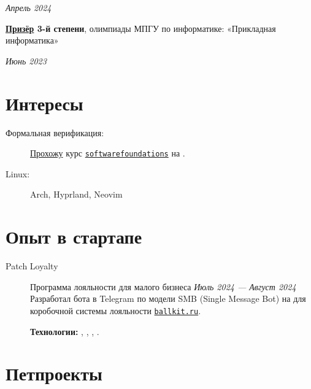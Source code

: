 \documentclass[margin,line]{resume}
\begin{document}
\begin{resume}
\hfill \textsl{Апрель 2024}

\textbf{\href{https://github.com/alchemmist/CV/blob/main/attachments/informatics-olimpic.pdf}{Призёр}
3-й степени}, олимпиады МПГУ по информатике:
«Прикладная информатика»
\vspace{-3mm}

\hfill \textsl{Июнь 2023}

\section{\mysidestyle Интересы}\vspace{1mm}
\begin{description}
  \item[Формальная верификация:]
    \href{https://github.com/alchemmist/coq-learning}{Прохожу} курс
    \texttt{\href{https://softwarefoundations.cis.upenn.edu}{softwarefoundations}}
    на .
  \item[Linux:] Arch, Hyprland, Neovim
\end{description}
\vfill

\section{\mysidestyle Опыт в стартапе}\vspace{2mm}

\begin{description}

  \item[Patch Loyalty]\small Программа лояльности для малого бизнеса \hfill
    \textsl{Июль 2024 — Август 2024\vspace{1mm}}\\
    Разработал бота в Telegram по модели SMB (Single Message Bot) на
     для коробочной системы лояльности
    \href{https://ballkit.ru}{\texttt{ballkit.ru}}.

    \textbf{Технологии:}
    ,
    , ,
    .
\end{description}

\section{\mysidestyle Петпроекты}\vspace{2mm}

\begin{description}


\end{description}
\end{resume}
\end{document}
